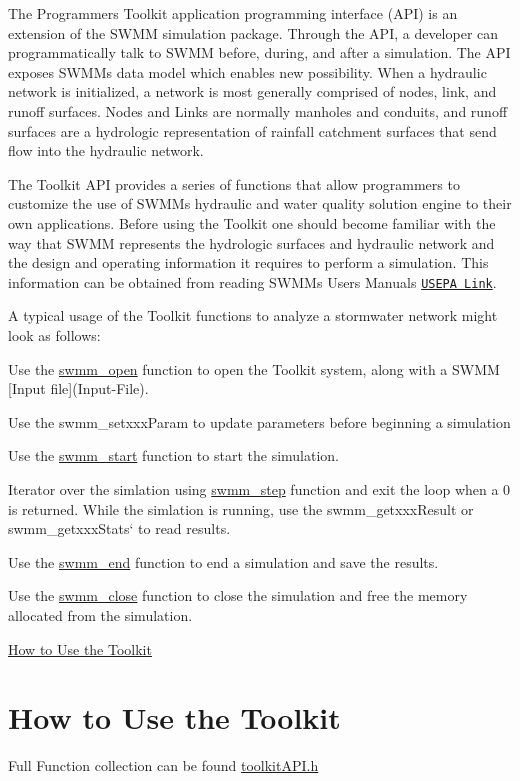 The Programmer\textquotesingle{}s Toolkit application programming interface (A\+PI) is an extension of the S\+W\+MM simulation package. Through the A\+PI, a developer can programmatically talk to S\+W\+MM before, during, and after a simulation. The A\+PI exposes S\+W\+MM\textquotesingle{}s data model which enables new possibility. When a hydraulic network is initialized, a network is most generally comprised of nodes, link, and runoff surfaces. Nodes and Links are normally manholes and conduits, and runoff surfaces are a hydrologic representation of rainfall catchment surfaces that send flow into the hydraulic network.

The Toolkit A\+PI provides a series of functions that allow programmers to customize the use of S\+W\+MM\textquotesingle{}s hydraulic and water quality solution engine to their own applications. Before using the Toolkit one should become familiar with the way that S\+W\+MM represents the hydrologic surfaces and hydraulic network and the design and operating information it requires to perform a simulation. This information can be obtained from reading S\+W\+MM\textquotesingle{}s Users Manuals \href{https://www.epa.gov/water-research/storm-water-management-model-swmm}{\tt U\+S\+E\+PA Link}.

A typical usage of the Toolkit functions to analyze a stormwater network might look as follows\+:


\begin{DoxyEnumerate}
\item Use the \hyperlink{swmm5_8h_a2da4baa38e451ef2a978f1366898948e}{swmm\+\_\+open} function to open the Toolkit system, along with a S\+W\+MM \mbox{[}Input file\mbox{]}(Input-\/\+File).
\item Use the {\ttfamily swmm\+\_\+setxxx\+Param} to update parameters before beginning a simulation
\item Use the \hyperlink{swmm5_8h_a06eb7b28597a24f892edfc303e12b2d7}{swmm\+\_\+start} function to start the simulation.
\item Iterator over the simlation using \hyperlink{swmm5_8h_a20624449e77d94d71c0e61d7f58558b5}{swmm\+\_\+step} function and exit the loop when a 0 is returned. While the simlation is running, use the {\ttfamily swmm\+\_\+getxxx\+Result} or swmm\+\_\+getxxx\+Stats` to read results.
\item Use the \hyperlink{swmm5_8h_a8e69e10ab4948522041deb92fc4b43c0}{swmm\+\_\+end} function to end a simulation and save the results.
\item Use the \hyperlink{swmm5_8h_a76dac918844d9551a1b39432284b70ef}{swmm\+\_\+close} function to close the simulation and free the memory allocated from the simulation.
\end{DoxyEnumerate}
\begin{DoxyItemize}
\item \hyperlink{how-to-use}{How to Use the Toolkit} 
\end{DoxyItemize}\hypertarget{how-to-use}{}\section{How to Use the Toolkit}\label{how-to-use}
Full Function collection can be found \hyperlink{toolkit_a_p_i_8h}{toolkit\+A\+P\+I.\+h}


